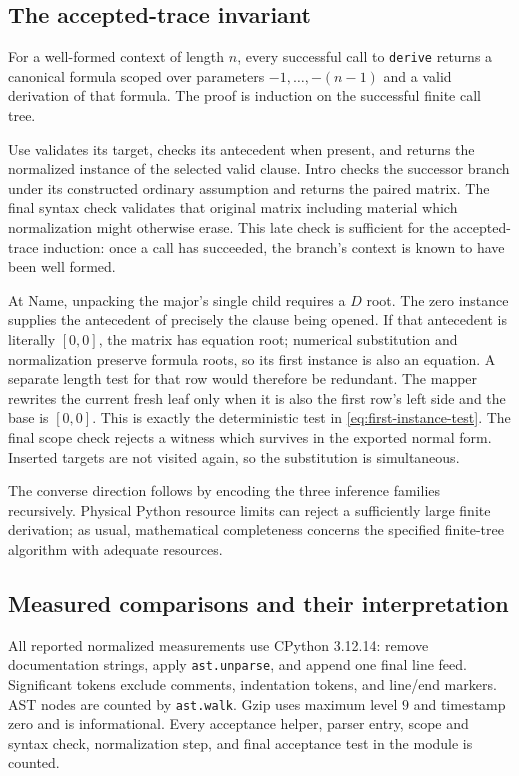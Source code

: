 \documentclass[11pt,a4paper]{article}
\theoremstyle{definition}\newtheorem{definition}[theorem]{Definition}
\theoremstyle{remark}\newtheorem{remark}[theorem]{Remark}
\begin{document}
\subsection{The accepted-trace invariant}

For a well-formed context of length $n$, every successful call to
\texttt{derive} returns a canonical formula scoped over parameters
$-1,\ldots,-(n-1)$ and a valid derivation of that formula.
The proof is induction on the successful finite call tree.

Use validates its target, checks its antecedent when present, and returns
the normalized instance of the selected valid clause. Intro checks the
successor branch under its constructed ordinary assumption and returns
the paired matrix. The final syntax check validates that original matrix
including material which normalization might otherwise erase. This
late check is sufficient for the accepted-trace induction: once a call
has succeeded, the branch's context is known to have been well formed.

At Name, unpacking the major's single child requires a $D$ root. The
zero instance supplies the antecedent of precisely the clause being
opened. If that antecedent is literally $[0,0]$, the matrix has equation
root; numerical substitution and normalization preserve formula roots,
so its first instance is also an equation. A separate length test for
that row would therefore be redundant. The mapper rewrites the current
fresh leaf only when it is also the first row's left side and the base
is $[0,0]$. This is exactly the deterministic test in
\eqref{eq:first-instance-test}. The final scope check rejects a witness
which survives in the exported normal form. Inserted targets are not
visited again, so the substitution is simultaneous.

The converse direction follows by encoding the three inference families
recursively. Physical Python resource limits can reject a sufficiently
large finite derivation; as usual, mathematical completeness concerns
the specified finite-tree algorithm with adequate resources.

\subsection{Measured comparisons and their interpretation}

All reported normalized measurements use CPython 3.12.14: remove
documentation strings, apply \texttt{ast.unparse}, and append one final
line feed. Significant tokens exclude comments, indentation tokens,
and line/end markers. AST nodes are counted by \texttt{ast.walk}.
Gzip uses maximum level $9$ and timestamp zero and is informational.
Every acceptance helper, parser entry, scope and syntax check,
normalization step, and final acceptance test in the module is counted.
\end{document}
